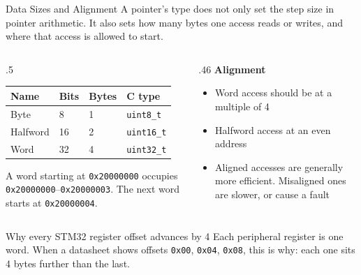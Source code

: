 \documentclass[9pt,aspectratio=169,xcolor=table]{beamer}
\newcommand{\striped}{\rowcolors{1}{white}{stripe}}
\begin{document}
\begin{frame}{Data Sizes and Alignment}
    \leavevmode
    {\small A pointer's type does not only set the step size in pointer
    arithmetic. It also sets how many bytes one access reads or writes,
    and where that access is allowed to start.}

    \begin{columns}[T]
    \begin{column}{.5\textwidth}
        {\small
        \striped
        \begin{tabular}{@{}l l l l@{}}
            \toprule
            \textbf{Name} & \textbf{Bits} & \textbf{Bytes} & \textbf{C type} \\
            \midrule
            Byte     & 8  & 1 & \texttt{uint8\_t} \\
            Halfword & 16 & 2 & \texttt{uint16\_t} \\
            Word     & 32 & 4 & \texttt{uint32\_t} \\
            \bottomrule
        \end{tabular}}

        \vspace{3mm}
        {\small A word starting at \texttt{0x20000000} occupies
        \texttt{0x20000000}--\texttt{0x20000003}. The next word starts at
        \texttt{0x20000004}.}
    \end{column}
    \begin{column}{.46\textwidth}
        \textbf{Alignment}
        {\small
        \begin{itemize}\itemsep1pt
            \item Word access should be at a \alert{multiple of 4}
            \item Halfword access at an \alert{even} address
            \item Aligned accesses are generally more efficient.
                  Misaligned ones are slower, or cause a fault
        \end{itemize}}
    \end{column}
    \end{columns}

    \vspace{3mm}
    \begin{block}{Why every STM32 register offset advances by 4}
        Each peripheral register is one \alert{word}. When a datasheet
        shows offsets \texttt{0x00}, \texttt{0x04}, \texttt{0x08}, this
        is why: each one sits 4 bytes further than the last.
    \end{block}
\end{frame}
\end{document}
